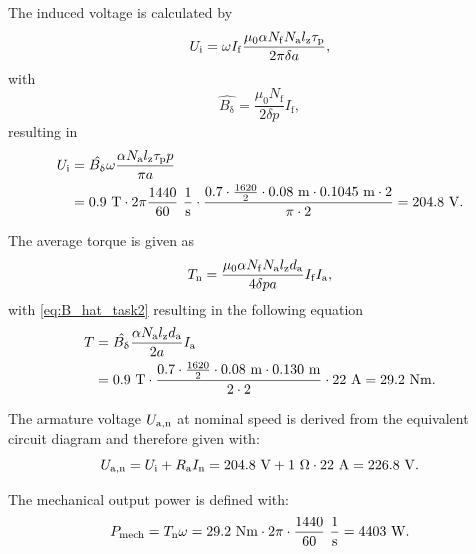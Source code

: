 \begin{solutionblock}
	The induced voltage is calculated by
	\begin{equation}
		U_{\mathrm{i}} = \omega I_{\mathrm{f}} \frac{\mu_{\mathrm{0}} \alpha N_{\mathrm{f}} N_{\mathrm{a}} \lz \taup}{2 \pi \delta a},
	\end{equation}
	with
	\begin{equation}
		\hat{B_{\updelta}} = \frac{\mu_{\mathrm{0}} N_{\mathrm{f}}}{2 \delta p} I_{\mathrm{f}},
		\label{eq:B_hat_task2}
	\end{equation}
	resulting in
	\begin{align}
		\begin{split}
			U_{\mathrm{i}} & = \hat{B_{\updelta}} \omega \frac{\alpha N_{\mathrm{a}} \lz \taup p}{\pi a}                                                                                       \\
			               & = 0.9 \ \si{T} \cdot 2\pi \frac{1440}{60} \ \si{\frac{1}{s}} \cdot \frac{0.7 \cdot \frac{1620}{2} \cdot 0.08 \ \si{m} \cdot 0.1045 \ \si{m} \cdot 2}{\pi \cdot 2}
			= 204.8 \ \si{V}.
		\end{split}
	\end{align}

	The average torque is given as
	\begin{equation}
		\Tn
		= \frac{\mu_{\mathrm{0}} \alpha N_{\mathrm{f}} N_{\mathrm{a}} \lz d_{\mathrm{a}}}{4 \delta p a} I_{\mathrm{f}} I_{\mathrm{a}},
	\end{equation}
	with \eqref{eq:B_hat_task2} resulting in the following equation
	\begin{align}
		\begin{split}
			T & = \hat{B_{\updelta}} \frac{\alpha N_{\mathrm{a}} \lz d_{\mathrm{a}}}{2a} \Ia                                               \\
			  & = 0.9 \ \si{T} \cdot \frac{0.7 \cdot \frac{1620}{2} \cdot 0.08 \ \si{m} \cdot 0.130 \ \si{m}}{2 \cdot 2} \cdot 22 \ \si{A}
			= 29.2 \ \si{Nm}.
		\end{split}
	\end{align}

	The armature voltage $\Uan$ at nominal speed is derived from the equivalent circuit diagram and therefore given with:
	\begin{equation}
		\Uan = \Ui + \Ra \In
		= 204.8 \ \si{V} + 1 \ \si{\Omega} \cdot 22 \ \si{A}
		= 226.8 \ \si{V}.
	\end{equation}

	The mechanical output power is defined with:
	\begin{equation}
		P_{\mathrm{mech}} = \Tn \omega
		= 29.2 \ \si{Nm} \cdot 2\pi \cdot \frac{1440}{60} \ \si{\frac{1}{s}}
		= 4403 \ \si{W}.
	\end{equation}


\end{solutionblock}
